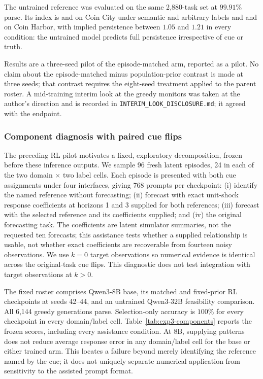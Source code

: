 The untrained reference was evaluated on the same 2{,}880-task set at $99.91\%$
parse. Its index is \eSelCitySemBase{} and \eSelCityArbBase{} on Coin City under
semantic and arbitrary labels and \eSelHarborSemBase{} and \eSelHarborArbBase{}
on Coin Harbor, with implied persistence between $1.05$ and $1.21$ in every
condition: the untrained model predicts full persistence irrespective of cue or
truth.

Results are a three-seed pilot of the episode-matched arm, reported as a pilot.
No claim about the episode-matched minus population-prior contrast is made at
three seeds; that contrast requires the eight-seed treatment applied to the
parent roster. A mid-training interim look at the greedy monitors was taken at
the author's direction and is recorded in
\texttt{INTERIM\_LOOK\_DISCLOSURE.md}; it agreed with the endpoint.



\subsubsection{Component diagnosis with paired cue flips}
\label{app:exp3-components}

The preceding RL pilot motivates a fixed, exploratory decomposition, frozen
before these inference outputs. We sample 96 fresh latent episodes, 24 in each
of the two domain $\times$ two label cells. Each episode is presented with both
cue assignments under four interfaces, giving 768 prompts per checkpoint:
(i) identify the named reference without forecasting; (ii) forecast with exact
unit-shock response coefficients at horizons 1 and 3 supplied for both
references; (iii) forecast with the selected reference and its coefficients
supplied; and (iv) the original forecasting task. The coefficients are latent
simulator summaries, not the requested ten forecasts; this assistance tests
whether a supplied relationship is usable, not whether exact coefficients are
recoverable from fourteen noisy observations. We use $k=0$ target observations
so numerical evidence is identical across the original-task cue flips. This
diagnostic does not test integration with target observations at $k>0$.

The fixed roster comprises Qwen3-8B base, its matched and fixed-prior RL
checkpoints at seeds 42--44, and an untrained Qwen3-32B feasibility comparison.
All 6,144 greedy generations parse. Selection-only accuracy is $100\%$ for
every checkpoint in every domain/label cell. Table~\ref{tab:exp3-components}
reports the frozen scores, including every assistance condition. At 8B,
supplying patterns does not reduce average response error in any domain/label
cell for the base or either trained arm. This locates a failure beyond merely
identifying the reference named by the cue; it does not uniquely separate
numerical application from sensitivity to the assisted prompt format.

